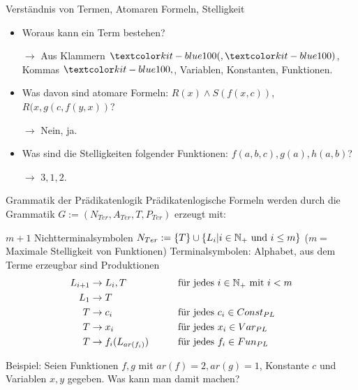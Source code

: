 \documentclass[handout]{beamer}
\begin{document}
\begin{frame}{Verständnis von Termen, Atomaren Formeln, Stelligkeit}
\begin{itemize}
	\item Woraus kann ein Term bestehen? \pause
	\item[$\rightarrow$] Aus Klammern $\markBlue{(}, \markBlue{)}$, Kommas $\markBlue{,}$, Variablen, Konstanten, Funktionen.\pause
	\item Was davon sind atomare Formeln: $R(x) \land S(f(x, c))$, $R(x, g(c, f(y, x))$?\pause
	\item[$\rightarrow$] Nein, ja.\pause
	\item Was sind die Stelligkeiten folgender Funktionen: $f(a, b, c), g(a), h(a, b)$? \pause \item[$\rightarrow$] $3,1,2$.
\end{itemize}	
\end{frame}

\begin{frame}{Grammatik der Prädikatenlogik}
	Prädikatenlogische Formeln werden durch die Grammatik $G := (N_{Ter}, A_{Ter}, T, P_{Ter})$ erzeugt mit:
	
	\bp
	
	\begin{itemize}
		\pitem $m+1$ Nichtterminalsymbolen $N_{Ter} := \{T\} \cup \{L_i | i \in \mathbb{N}_+ \text{ und } i \leq m \}$ ($m = $ Maximale Stelligkeit von Funktionen)
		\pitem Terminalsymbolen: Alphabet, aus dem Terme erzeugbar sind
		\pitem Produktionen
		\begin{alignat*}{2}
		L_{i+1} &\to L_i , T &\qquad& \text{für jedes } i\in\N_+\text{ mit } i<m   \\
		L_1  &\to T \\ %
		T &\to c_i && \text{für jedes } c_i\in Const_{PL}\\
		T &\to x_i && \text{für jedes } x_i\in Var_{PL}\\
		T &\to f_i(L_{ar(f_i)} ) && \text{für jedes } f_i\in Fun_{PL}
		\end{alignat*}
	\end{itemize}

	\bp
	
	Beispiel: Seien Funktionen $f,g$ mit $ar(f) = 2, ar(g) = 1$, Konstante $c$ und Variablen $x,y$ gegeben. Was kann man damit machen?
\end{frame}
\end{document}

